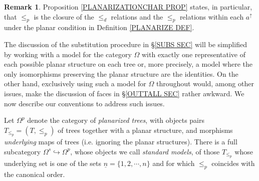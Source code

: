\documentclass[a4paper,10pt
,draft
]{article}%
\numberwithin{equation}{section}
\numberwithin{figure}{section}
\theoremstyle{definition} %
\newtheorem{remark}[equation]{Remark}%
\newcommand{\1}{\ensuremath{\mathbbm 1}}%
\begin{document}
\begin{remark}\label{CLOSURE REM}
Proposition \ref{PLANARIZATIONCHAR PROP} states, in particular,
that $\leq_p$ is the closure of the $\leq_d$ relations  
and the $\leq_p$ relations within each $a^{\uparrow}$
under the planar condition in 
Definition \ref{PLANARIZE DEF}.
\end{remark}


The discussion of the substitution procedure in \S \ref{SUBS SEC} 
will be simplified by working with 
a model for the category $\Omega$
with exactly one representative
of each possible planar structure on each tree or, more precisely, a model where the only isomorphisms preserving the planar structure are the identities.
On the other hand, exclusively using such a model for $\Omega$ throughout would, among other issues, make the discussion of faces in \S \ref{OUTTALL SEC} rather awkward.
We now describe our conventions to address such issues.

Let $\Omega^p$ denote the category of \textit{planarized trees},
with objects pairs $T_{\leq_p}=(T,\leq_p)$ of trees together with a planar structure,
and morphisms \textit{underlying} maps of trees (i.e. ignoring the planar structures).
There is a full subcategory $\Omega^s \hookrightarrow \Omega^p$, whose objects we call \textit{standard models}, of those $T_{\leq_p}$ whose underlying set is one of the sets $\underline{n} = \{1,2,\cdots,n\}$ and for which $\leq_p$ coincides with the canonical order.
\end{document}
